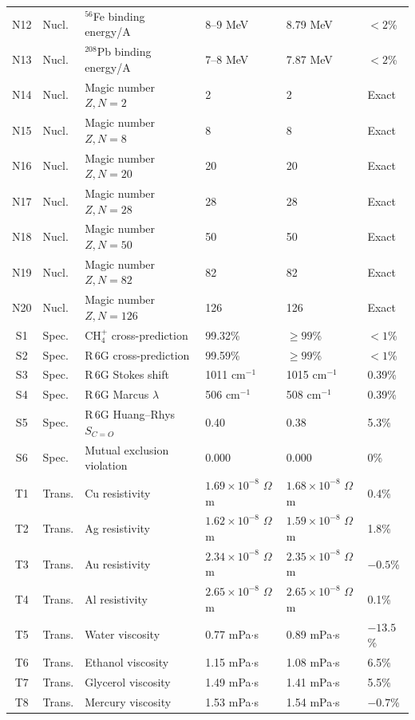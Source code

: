 \begin{longtable}{@{}clp{4.2cm}p{3cm}p{3cm}l@{}}
N12 & Nucl. & $^{56}$Fe binding energy/A & 8--9 MeV & 8.79 MeV & $<2$\% \\
N13 & Nucl. & $^{208}$Pb binding energy/A & 7--8 MeV & 7.87 MeV & $<2$\% \\
N14 & Nucl. & Magic number $Z,N=2$ & 2 & 2 & Exact \\
N15 & Nucl. & Magic number $Z,N=8$ & 8 & 8 & Exact \\
N16 & Nucl. & Magic number $Z,N=20$ & 20 & 20 & Exact \\
N17 & Nucl. & Magic number $Z,N=28$ & 28 & 28 & Exact \\
N18 & Nucl. & Magic number $Z,N=50$ & 50 & 50 & Exact \\
N19 & Nucl. & Magic number $Z,N=82$ & 82 & 82 & Exact \\
N20 & Nucl. & Magic number $Z,N=126$ & 126 & 126 & Exact \\
S1  & Spec. & CH$_4^+$ cross-prediction & 99.32\% & $\geq 99$\% & $<1$\% \\
S2  & Spec. & R\,6G cross-prediction & 99.59\% & $\geq 99$\% & $<1$\% \\
S3  & Spec. & R\,6G Stokes shift & 1011 cm$^{-1}$ & 1015 cm$^{-1}$ & 0.39\% \\
S4  & Spec. & R\,6G Marcus $\lambda$ & 506 cm$^{-1}$ & 508 cm$^{-1}$ & 0.39\% \\
S5  & Spec. & R\,6G Huang--Rhys $S_{C=O}$ & 0.40 & 0.38 & 5.3\% \\
S6  & Spec. & Mutual exclusion violation & 0.000 & 0.000 & 0\% \\
T1  & Trans. & Cu resistivity & $1.69\times10^{-8}$ $\Omega$m & $1.68\times10^{-8}$ $\Omega$m & 0.4\% \\
T2  & Trans. & Ag resistivity & $1.62\times10^{-8}$ $\Omega$m & $1.59\times10^{-8}$ $\Omega$m & 1.8\% \\
T3  & Trans. & Au resistivity & $2.34\times10^{-8}$ $\Omega$m & $2.35\times10^{-8}$ $\Omega$m & $-0.5$\% \\
T4  & Trans. & Al resistivity & $2.65\times10^{-8}$ $\Omega$m & $2.65\times10^{-8}$ $\Omega$m & 0.1\% \\
T5  & Trans. & Water viscosity & 0.77 mPa$\cdot$s & 0.89 mPa$\cdot$s & $-13.5$\% \\
T6  & Trans. & Ethanol viscosity & 1.15 mPa$\cdot$s & 1.08 mPa$\cdot$s & 6.5\% \\
T7  & Trans. & Glycerol viscosity & 1.49 mPa$\cdot$s & 1.41 mPa$\cdot$s & 5.5\% \\
T8  & Trans. & Mercury viscosity & 1.53 mPa$\cdot$s & 1.54 mPa$\cdot$s & $-0.7$\% \\

\end{longtable}
